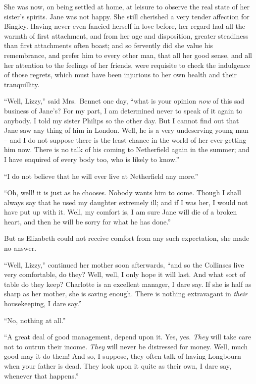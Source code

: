 She was now, on being settled at home, at leisure to
observe the real state of her sister’s spirits. Jane was
not happy. She still cherished a very tender affection
for Bingley. Having never even fancied herself in love
before, her regard had all the warmth of first attachment,
and from her age and disposition, greater steadiness than
first attachments often boast; and so fervently did she
value his remembrance, and prefer him to every other
man, that all her good sense, and all her attention to the
feelings of her friends, were requisite to check the indulgence
of those regrets, which must have been injurious
to her own health and their tranquillity.

“Well, Lizzy,” said Mrs.\ Bennet one day, “what is
your opinion \textit{now} of this sad business of Jane’s? For my
part, I am determined never to speak of it again to anybody.
I told my sister Philips so the other day. But
I cannot find out that Jane saw any thing of him in London.
Well, he is a very undeserving young man -- and I do not
suppose there is the least chance in the world of her ever
getting him now. There is no talk of his coming to Netherfield
again in the summer; and I have enquired of every
body too, who is likely to know.”

“I do not believe that he will ever live at Netherfield
any more.”

“Oh, well! it is just as he chooses. Nobody wants
him to come. Though I shall always say that he used
my daughter extremely ill; and if I was her, I would
not have put up with it. Well, my comfort is, I am sure
Jane will die of a broken heart, and then he will be sorry
for what he has done.”

But as Elizabeth could not receive comfort from any
such expectation, she made no answer.

“Well, Lizzy,” continued her mother soon afterwards,
“and so the Collinses live very comfortable, do they?
Well, well, I only hope it will last. And what sort of table
do they keep? Charlotte is an excellent manager, I dare
say. If she is half as sharp as her mother, she is saving
enough. There is nothing extravagant in \textit{their} housekeeping,
I dare say.”

“No, nothing at all.”

“A great deal of good management, depend upon it.
Yes, yes. \textit{They} will take care not to outrun their income.
\textit{They} will never be distressed for money. Well, much good
may it do them! And so, I suppose, they often talk of
having Longbourn when your father is dead. They look
upon it quite as their own, I dare say, whenever that
happens.”

